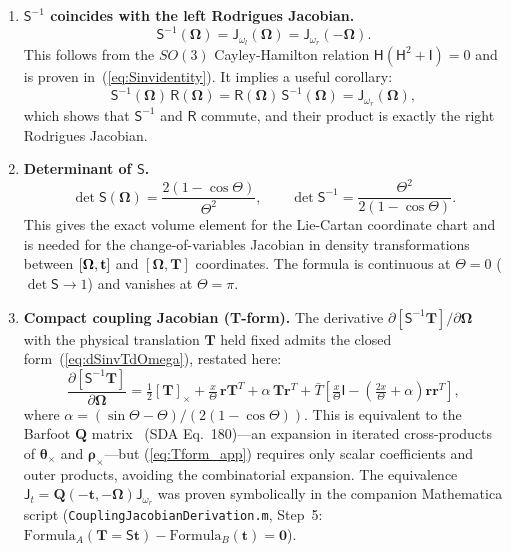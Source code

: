 \documentclass[journal]{IEEEtran}
\newcommand{\bfOmega}{\boldsymbol{\Omega}}
\newcommand{\bfrho}{\boldsymbol{\rho}}
\newcommand{\bftheta}{\boldsymbol{\theta}}
\newcommand{\beq}{\begin{equation}}
\newcommand{\eeq}{\end{equation}}
\begin{document}
\begin{enumerate}
\item \textbf{$\mathsf{S}^{-1}$ coincides with the left Rodrigues
Jacobian.}
\beq
    \mathsf{S}^{-1}(\bfOmega) = \mathsf{J}_{\omega_l}(\bfOmega)
    = \mathsf{J}_{\omega_r}(-\bfOmega).
    \label{eq:sinv_identity_app}
\eeq
This follows from the $SO(3)$ Cayley-Hamilton relation
$\mathsf{H}(\mathsf{H}^2 + \mathsf{I})=0$ and is proven
in~(\ref{eq:Sinvidentity}). It implies a useful corollary:
\beq
    \mathsf{S}^{-1}(\bfOmega)\,\mathsf{R}(\bfOmega) 
    = \mathsf{R}(\bfOmega)\,\mathsf{S}^{-1}(\bfOmega)
    = \mathsf{J}_{\omega_r}(\bfOmega),
    \label{eq:sinvR_identity_app}
\eeq
which shows that $\mathsf{S}^{-1}$ and $\mathsf{R}$ commute,
and their product is exactly the right Rodrigues Jacobian.

\item \textbf{Determinant of $\mathsf{S}$.}
\beq
    \det \mathsf{S}(\bfOmega) = \frac{2(1-\cos\Theta)}{\Theta^2},
    \qquad
    \det \mathsf{S}^{-1} = \frac{\Theta^2}{2(1-\cos\Theta)}.
    \label{eq:detS_app}
\eeq
This gives the exact volume element for the
Lie-Cartan coordinate chart and is needed for the
change-of-variables Jacobian in density transformations
between $[\bfOmega, {\bf t}]$ and $[\bfOmega, \mathbf{T}]$
coordinates. The formula is continuous at $\Theta=0$
($\det\mathsf{S} \to 1$) and vanishes at $\Theta=\pi$.

\item \textbf{Compact coupling Jacobian (T-form).}
The derivative $\partial[\mathsf{S}^{-1}\mathbf{T}]/\partial\bfOmega$
with the physical translation $\mathbf{T}$ held fixed admits the
closed form~(\ref{eq:dSinvTdOmega}), restated here:
\beq
    \frac{\partial[\mathsf{S}^{-1}\mathbf{T}]}{\partial\bfOmega} =
    \tfrac{1}{2}[\mathbf{T}]_\times + \tfrac{x}{\Theta}\,\mathbf{r}\mathbf{T}^T
    + \alpha\,\mathbf{T}\mathbf{r}^T
    + \bar T\!\left[\tfrac{x}{\Theta}\mathsf{I}
    - \left(\tfrac{2x}{\Theta}+\alpha\right)\mathbf{r}\mathbf{r}^T\right],
    \label{eq:Tform_app}
\eeq
where $\alpha = (\sin\Theta-\Theta)/(2(1-\cos\Theta))$.
This is equivalent to the Barfoot $\mathbf{Q}$ matrix~\cite{barfoot2024}
(SDA Eq.~180)---an expansion in iterated cross-products of
$\bftheta_\times$ and $\bfrho_\times$---but 
(\ref{eq:Tform_app}) requires only scalar coefficients and
outer products, avoiding the combinatorial expansion. 
The equivalence $\mathsf{J}_t = \mathbf{Q}(-\mathbf{t},-\bfOmega)\mathsf{J}_{\omega_r}$
was proven symbolically in the companion Mathematica script
(\texttt{CouplingJacobianDerivation.m}, Step~5: 
$\text{Formula}_A(\mathbf{T}=\mathsf{S}\mathbf{t}) - 
\text{Formula}_B(\mathbf{t}) = \mathbf{0}$).
\end{enumerate}
\end{document}
